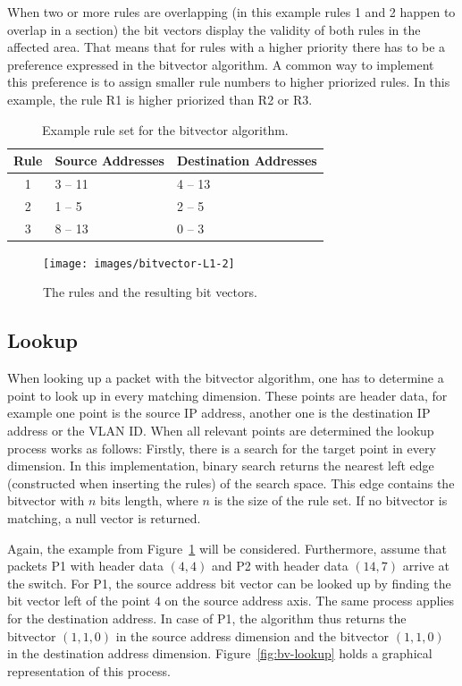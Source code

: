 \documentclass[a4paper,
		12pt,
		parskip=full,
		titlepage
		]{scrartcl}
\begin{document}
When two or more rules are overlapping (in this example rules 1 and 2 happen 
to overlap in a section) the bit vectors display the validity of both rules in the affected area.
That means that for rules with a higher priority there has to be a preference expressed in the bitvector algorithm.
A common way to implement this preference is to assign smaller rule numbers to higher priorized rules.
In this example, the rule R1 is higher priorized than R2 or R3.

\begin{table}
  \centering
  \begin{tabularx}{0.7\textwidth}{c|X|X}
  Rule&Source Addresses&Destination Addresses\\
  \hline
  1&3 -- 11&4 -- 13\\
  2&1 -- 5&2 -- 5\\
  3&8 -- 13&0 -- 3\\
  \end{tabularx}
  \caption{Example rule set for the bitvector algorithm.}
  \label{table:bv_ruleset}
\end{table}

\begin{figure}
\centering
\texttt{[image: images/bitvector-L1-2]}
\caption{The rules and the resulting bit vectors.}
\label{fig:bv-normal}
\end{figure}

\subsection{Lookup}
When looking up a packet with the bitvector algorithm, one has to determine a point to look up in every matching dimension.
These points are header data, for example one point is the source IP address, another one is the destination IP address or the VLAN ID.
When all relevant points are determined the lookup process works as follows:
Firstly, there is a search for the target point in every dimension.
In this implementation, binary search returns the nearest left edge (constructed when inserting the rules) of the search space.
This edge contains the bitvector with $n$ bits length, where $n$ is the size of the rule set.
If no bitvector is matching, a null vector is returned.

Again, the example from Figure~\ref{fig:bv-normal} will be considered.
Furthermore, assume that packets P1 with header data $(4, 4)$ and P2 with header data $(14, 7)$ arrive at the switch.
For P1, the source address bit vector can be looked up by finding the bit vector left of the point $4$ on the source address axis.
The same process applies for the destination address.
In case of P1, the algorithm thus returns the bitvector $(1, 1, 0)$ in the 
source address dimension and the bitvector $(1, 1, 0)$ in the destination address dimension.
Figure~\ref{fig:bv-lookup} holds a graphical representation of this process.
\end{document}
